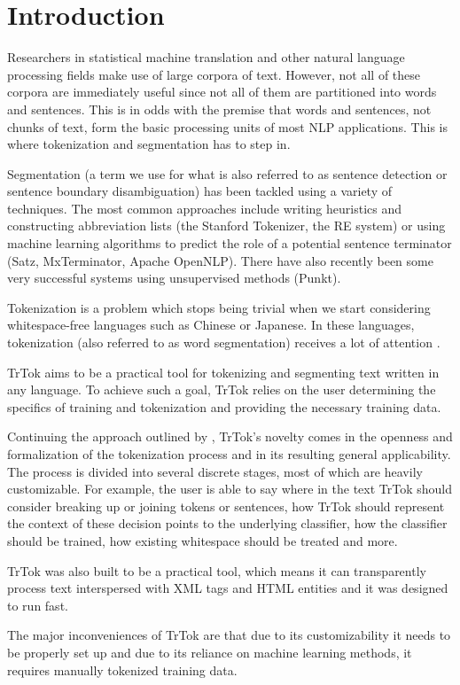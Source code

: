 \section{Introduction}
\label{sec:introduction}

Researchers in statistical machine translation and other natural
language processing fields make use of large corpora of text. However,
not all of these corpora are immediately useful since not all of them
are partitioned into words and sentences. This is in odds with the
premise that words and sentences, not chunks of text, form the basic
processing units of most NLP applications. This is where tokenization
and segmentation has to step in.

Segmentation (a term we use for what is also referred to as sentence
detection or sentence boundary disambiguation) has been tackled using
a variety of techniques. The most common approaches include writing
heuristics and constructing abbreviation lists (the Stanford
Tokenizer, the RE system) or using machine learning algorithms to
predict the role of a potential sentence terminator (Satz,
MxTerminator, Apache OpenNLP). There have also recently been some very
successful systems using unsupervised methods (Punkt).

Tokenization is a problem which stops being trivial when we start
considering whitespace-free languages such as Chinese or Japanese. In
these languages, tokenization (also referred to as word segmentation)
receives a lot of attention \cite{seg-bakeoff}.

TrTok aims to be a practical tool for tokenizing and segmenting text
written in any language. To achieve such a goal, TrTok relies on the
user determining the specifics of training and tokenization and
providing the necessary training data.

Continuing the approach outlined by \citet{sbd-trtok-orig}, TrTok's
novelty comes in the openness and formalization of the tokenization
process and in its resulting general applicability. The process is
divided into several discrete stages, most of which are heavily
customizable. For example, the user is able to say where in the text
TrTok should consider breaking up or joining tokens or sentences, how
TrTok should represent the context of these decision points to the
underlying classifier, how the classifier should be trained, how
existing whitespace should be treated and more.

TrTok was also built to be a practical tool, which means it can
transparently process text interspersed with XML tags and HTML
entities and it was designed to run fast.

The major inconveniences of TrTok are that due to its customizability
it needs to be properly set up and due to its reliance on machine
learning methods, it requires manually tokenized training data.
